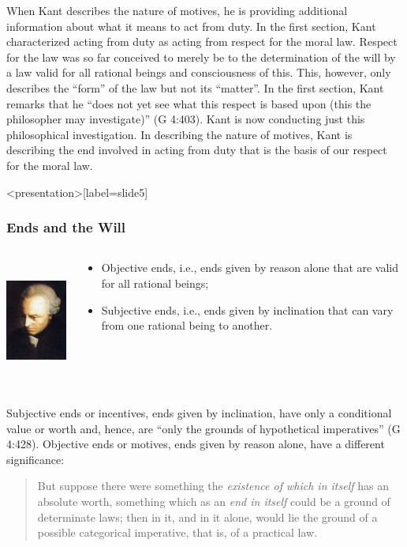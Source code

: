 When Kant describes the nature of motives, he is providing additional information about what it means to act from duty. In the first section, Kant characterized acting from duty as acting from respect for the moral law. Respect for the law was so far conceived to merely be to the determination of the will by a law valid for all rational beings and consciousness of this. This, however, only describes the ``form'' of the law but not its ``matter''. In the first section, Kant remarks that he ``does not yet see what this respect is based upon (this the philosopher may investigate)'' (G 4:403). Kant is now conducting just this philosophical investigation. In describing the nature of motives, Kant is describing the end involved in acting from duty that is the basis of our respect for the moral law. \change

\begin{frame}<presentation>[label=slide5]
    \frametitle{Ends and the Will}
        \begin{columns}
            \begin{column}{3cm}
                \includegraphics[height=4cm]{../../graphics/kant.jpg}
            \end{column}
            \begin{column}{7cm}
                \begin{itemize}
                    \item \alert{Objective ends}, i.e., ends given by reason alone that are valid for all rational beings;
                    \item \alert{Subjective ends}, i.e., ends given by inclination that can vary from one rational being to another.
                \end{itemize}
            \end{column}
        \end{columns}
\end{frame}

Subjective ends or incentives, ends given by inclination, have only a conditional value or worth and, hence, are ``only the grounds of hypothetical imperatives'' (G 4:428). Objective ends or motives, ends given by reason alone, have a different significance:
\begin{quote}
But suppose there were something the \emph{existence of which in itself} has an absolute worth, something which as an \emph{end in itself} could be a ground of determinate laws; then in it, and in it alone, would lie the ground of a possible categorical imperative, that is, of a practical law.
\end{quote}

